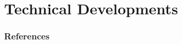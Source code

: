 \section{Technical Developments}




\begin{frame}[allowframebreaks]
\frametitle{References}


\end{frame}


